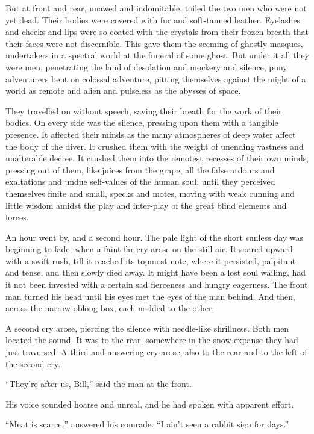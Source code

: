 \documentclass[10pt]{book}
\begin{document}
But at front and rear, unawed and indomitable, toiled the two men who
were not yet dead. Their bodies were covered with fur and soft-tanned
leather. Eyelashes and cheeks and lips were so coated with the crystals
from their frozen breath that their faces were not discernible. This
gave them the seeming of ghostly masques, undertakers in a spectral
world at the funeral of some ghost. But under it all they were men,
penetrating the land of desolation and mockery and silence, puny
adventurers bent on colossal adventure, pitting themselves against the
might of a world as remote and alien and pulseless as the abysses of
space.

They travelled on without speech, saving their breath for the work of
their bodies. On every side was the silence, pressing upon them with a
tangible presence. It affected their minds as the many atmospheres of
deep water affect the body of the diver. It crushed them with the
weight of unending vastness and unalterable decree. It crushed them
into the remotest recesses of their own minds, pressing out of them,
like juices from the grape, all the false ardours and exaltations and
undue self-values of the human soul, until they perceived themselves
finite and small, specks and motes, moving with weak cunning and little
wisdom amidst the play and inter-play of the great blind elements and
forces.

An hour went by, and a second hour. The pale light of the short sunless
day was beginning to fade, when a faint far cry arose on the still air.
It soared upward with a swift rush, till it reached its topmost note,
where it persisted, palpitant and tense, and then slowly died away. It
might have been a lost soul wailing, had it not been invested with a
certain sad fierceness and hungry eagerness. The front man turned his
head until his eyes met the eyes of the man behind. And then, across
the narrow oblong box, each nodded to the other.

A second cry arose, piercing the silence with needle-like shrillness.
Both men located the sound. It was to the rear, somewhere in the snow
expanse they had just traversed. A third and answering cry arose, also
to the rear and to the left of the second cry.

“They’re after us, Bill,” said the man at the front.

His voice sounded hoarse and unreal, and he had spoken with apparent
effort.

“Meat is scarce,” answered his comrade. “I ain’t seen a rabbit sign for
days.”
\end{document}
